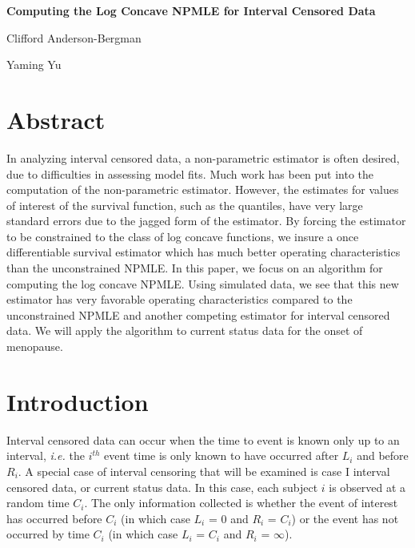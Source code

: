 \documentclass[10pt]{article}
\begin{document}
\begin{center}

{\bf Computing the Log Concave NPMLE for Interval Censored Data}


	Clifford Anderson-Bergman
	
	Yaming Yu
	
\end{center}

{\section {Abstract}}

	In analyzing interval censored data, a non-parametric estimator is often desired, due to difficulties in assessing model fits. Much work has been put into the computation of the non-parametric estimator. However, the estimates for values of interest of the survival function, such as the quantiles, have very large standard errors due to the jagged form of the estimator. By forcing the estimator to be constrained to the class of log concave functions, we insure a once differentiable survival estimator which has much better operating characteristics than the unconstrained NPMLE. In this paper, we focus on an algorithm for computing the log concave NPMLE. Using simulated data, we see that this new estimator has very favorable operating characteristics compared to the unconstrained NPMLE and another competing estimator for interval censored data. We will apply the algorithm to current status data for the onset of menopause. 

{\section{Introduction}}

	Interval censored data can occur when the time to event is known only up to an interval, \emph{i.e.} the $i^{th}$ event time is only known to have occurred after $L_{i}$ and before $R_i$. A special case of interval censoring that will be examined is case I interval censored data, or current status data. In this case, each subject $i$ is observed at a random time $C_i$. The only information collected is whether the event of interest has occurred before $C_i$ (in which case $L_i$ = 0 and $R_i$ = $C_i$) or the event has not occurred by time $C_i$ (in which case $L_i$ = $C_i$ and $R_i$ = $\infty$).
	
\end{document}

